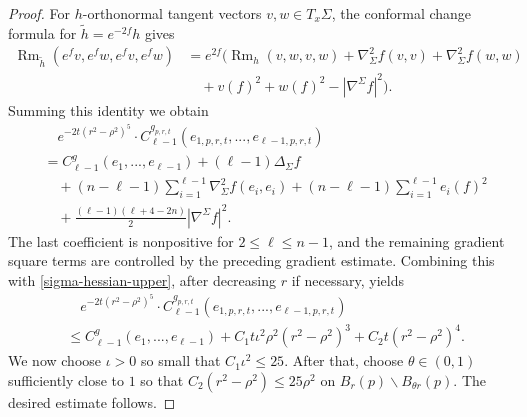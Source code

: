 \documentclass[11pt]{amsart}
\theoremstyle{definition}
\theoremstyle{remark}
\numberwithin{equation}{section}
\begin{document}
\begin{proof}
        For $h$-orthonormal tangent vectors $v,w\in T_x\Sigma$, the conformal change formula for
          $\tilde h=e^{-2f}h$ gives
        \[
        \begin{aligned}
            \operatorname{Rm}_{\tilde h}(e^fv,e^fw,e^fv,e^fw)
            &=e^{2f}\Big(\operatorname{Rm}_{h}(v,w,v,w)+\nabla_\Sigma^2f(v,v)
              +\nabla_\Sigma^2f(w,w)\\
            &\quad +v(f)^2+w(f)^2-|\nabla^\Sigma f|^2\Big).
        \end{aligned}
        \]
        Summing this identity we obtain
        \[
        \begin{aligned}
            &\quad e^{-2t(r^2-\rho^2)^5}\cdot
              C_{\ell-1}^{g_{p,r,t}}(e_{1,p,r,t},...,e_{\ell-1,p,r,t})\\
            &=C_{\ell-1}^{g}(e_{1},...,e_{\ell-1})+(\ell-1)\Delta_\Sigma f\\
            &\quad +(n-\ell-1)\sum_{i=1}^{\ell-1}\nabla_\Sigma^2f(e_i,e_i)
              +(n-\ell-1)\sum_{i=1}^{\ell-1}e_i(f)^2\\
            &\quad +\frac{(\ell-1)(\ell+4-2n)}{2}|\nabla^\Sigma f|^2 .
        \end{aligned}
        \]
        The last coefficient is nonpositive for $2\leq\ell\leq n-1$, and the remaining gradient
          square terms are controlled by the preceding gradient estimate. Combining this with
          \eqref{sigma-hessian-upper}, after decreasing $r$ if necessary, yields
        \[
        \begin{aligned}
            &\quad e^{-2t(r^2-\rho^2)^5}\cdot
              C_{\ell-1}^{g_{p,r,t}}(e_{1,p,r,t},...,e_{\ell-1,p,r,t})\\
            &\leq C_{\ell-1}^{g}(e_{1},...,e_{\ell-1})
              +C_1t\iota^2\rho^2(r^2-\rho^2)^3+C_2t(r^2-\rho^2)^4 .
        \end{aligned}
        \]
        We now choose $\iota>0$ so small that $C_1\iota^2\leq25$. After that, choose
          $\theta\in(0,1)$ sufficiently close to $1$ so that
          $C_2(r^2-\rho^2)\leq25\rho^2$ on $B_r(p)\backslash B_{\theta r}(p)$. The desired estimate
          follows.
    \end{proof}
\end{document}
